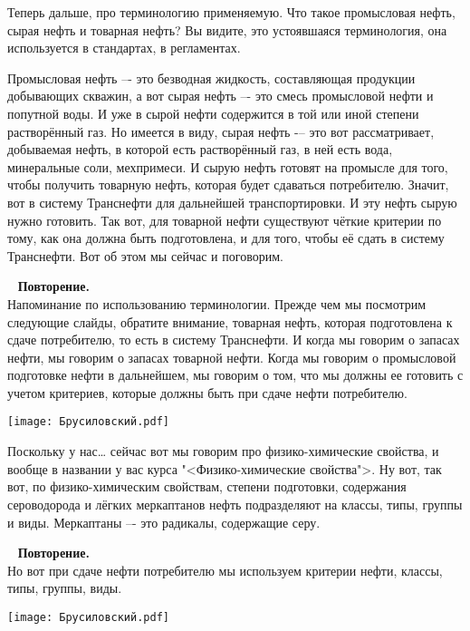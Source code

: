 \documentclass[main.tex]{subfiles}
\begin{document}
Теперь дальше, про терминологию применяемую.
Что такое промысловая нефть, сырая нефть и товарная нефть?
Вы видите, это устоявшаяся терминология, она используется в стандартах, в регламентах.

Промысловая нефть –- это безводная жидкость, составляющая продукции добывающих скважин, а вот сырая нефть –- это смесь промысловой нефти и попутной воды.
И уже в сырой нефти содержится в той или иной степени растворённый газ.
Но имеется в виду, сырая нефть -– это вот рассматривает, добываемая нефть, в которой есть растворённый газ, в ней есть вода, минеральные соли, мехпримеси.
И сырую нефть готовят на промысле для того, чтобы получить товарную нефть, которая будет сдаваться потребителю.
Значит, вот в систему Транснефти для дальнейшей транспортировки.
И эту нефть сырую нужно готовить.
Так вот, для товарной нефти существуют чёткие критерии по тому, как она должна быть подготовлена, и для того, чтобы её сдать в систему Транснефти.
Вот об этом мы сейчас и поговорим.

\ \newline
\textbf{Повторение.}\\
Напоминание по использованию терминологии.
Прежде чем мы посмотрим следующие слайды, обратите внимание, товарная нефть, которая подготовлена к сдаче потребителю, то есть в систему Транснефти.
И когда мы говорим о запасах нефти, мы говорим о запасах товарной нефти.
Когда мы говорим о промысловой подготовке нефти в дальнейшем, мы говорим о том, что мы должны ее готовить с учетом критериев, которые должны быть при сдаче нефти потребителю.

\begin{center}
\texttt{[image: Брусиловский.pdf]}
\end{center}

Поскольку у нас… сейчас вот мы говорим про физико-химические свойства,
и вообще в названии у вас курса "<Физико-химические свойства">.
Ну вот, так вот, по физико-химическим свойствам, степени подготовки, содержания сероводорода и лёгких меркаптанов нефть подразделяют на классы, типы, группы и виды.
Меркаптаны –- это радикалы, содержащие серу.

\ \newline
\textbf{Повторение.}\\
Но вот при сдаче нефти потребителю мы используем критерии нефти, классы, типы, группы, виды.

\begin{center}
\texttt{[image: Брусиловский.pdf]}
\end{center}
\end{document}
